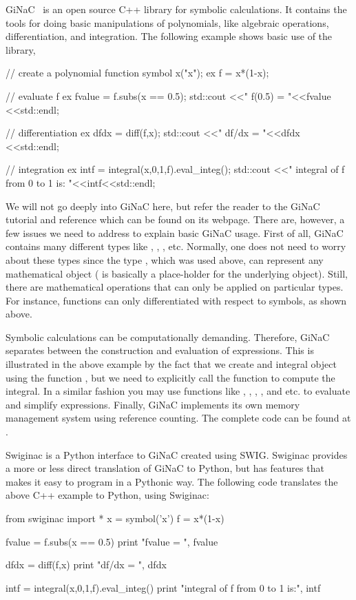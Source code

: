 GiNaC~\cite{BauerFrinkKreckel2000} is an open source C++ library for symbolic calculations. 
It contains the tools for doing basic manipulations of polynomials, like algebraic operations, 
differentiation, and integration. 
The following example shows basic use of the library,  
\begin{c++}
  // create a polynomial function
  symbol x("x");
  ex f = x*(1-x);

  // evaluate f
  ex fvalue = f.subs(x == 0.5);
  std::cout <<" f(0.5) = "<<fvalue <<std::endl;

  // differentiation
  ex dfdx  = diff(f,x);
  std::cout <<" df/dx = "<<dfdx <<std::endl;

  // integration
  ex intf  = integral(x,0,1,f).eval_integ();
  std::cout <<" integral of f from 0 to 1 is: "<<intf<<std::endl;
\end{c++}
We will not go deeply into GiNaC here, but refer the reader to the 
GiNaC tutorial and reference which can be found on its webpage. There are, however, a few
issues we need to address to explain basic GiNaC usage. First of all, GiNaC 
contains many different types like , , , etc. 
Normally, one does not need to worry about these types since the type , which
was used above, can represent any mathematical object ( is basically a place-holder for the underlying 
object). Still, there are mathematical operations that can only be applied on particular 
types. For instance, functions can only differentiated with respect to symbols, as shown above.  

Symbolic calculations can be computationally demanding. Therefore, GiNaC separates between 
the construction and evaluation of expressions. This is illustrated in the above example by
the fact that we create and integral object using the function , but we 
need to explicitly call the function  to compute the integral. In a similar
fashion you may use functions like , , , , 
and    etc. to evaluate and simplify expressions. 
Finally, GiNaC implements its own memory management system using reference counting.   
The complete code can be found at .

Swiginac is a Python interface to GiNaC created using SWIG.  
Swiginac provides a more or less direct translation of GiNaC to Python, 
but has features that makes it easy to program in a Pythonic way. 
The following code translates the above C++ example to Python, using Swiginac:
\begin{python}
from swiginac import *
x = symbol('x')
f = x*(1-x) 

fvalue = f.subs(x == 0.5)
print "fvalue = ", fvalue 

dfdx = diff(f,x)
print "df/dx = ", dfdx 

intf = integral(x,0,1,f).eval_integ()
print "integral of f from 0 to 1 is:", intf 
\end{python}

